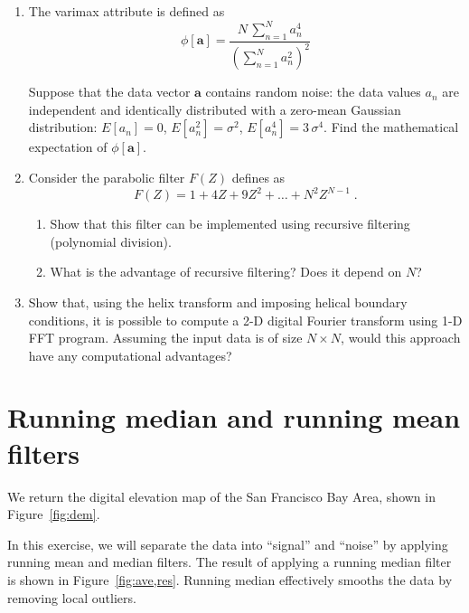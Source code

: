 \begin{enumerate}

\item The varimax attribute is defined as
\begin{equation}
  \label{eq:varimax}
\phi[\mathbf{a}] = \frac{\displaystyle N\,\sum\limits_{n=1}^N
  a_n^4}{\displaystyle \left(\sum\limits_{n=1}^{N} a_n^2\right)^2}
\end{equation}

Suppose that the data vector $\mathbf{a}$ contains random noise:
the data values $a_n$ are independent and identically distributed with
a zero-mean Gaussian distribution: $E[a_n]=0$, $E[a_n^2]=\sigma^2$,
$E[a_n^4]=3\,\sigma^4$. Find the mathematical expectation of
$\phi[\mathbf{a}]$.

\item Consider the parabolic filter $F(Z)$ defines as
\begin{equation}
\label{eq:parab}
F(Z) = 1 + 4 Z + 9 Z^2 + \ldots + N^2 Z^{N-1}\;.
\end{equation} 

\begin{enumerate}
\item Show that this filter can be implemented using recursive filtering (polynomial division).
\item What is the advantage of recursive filtering? Does it depend on $N$?
\end{enumerate}

\item Show that, using the helix transform and imposing helical boundary conditions, it is possible to compute a 2-D digital Fourier transform using 1-D FFT program. Assuming the input data is of size $N \times N$, would this approach have any computational advantages?

\end{enumerate}

\section{Running median and running mean filters}


We return the digital elevation map of the  San Francisco Bay Area, shown in Figure~\ref{fig:dem}.

In this exercise, we will separate the data into ``signal'' and
``noise'' by applying running mean and median filters.  The result of
applying a running median filter is shown in
Figure~\ref{fig:ave,res}. Running median effectively smooths the data
by removing local outliers.

